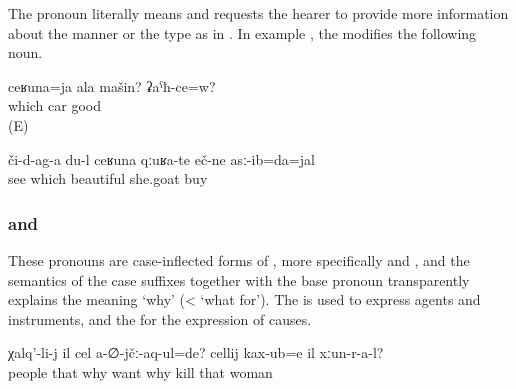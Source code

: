 The pronoun  literally means  and requests the hearer to provide more information about the manner or the type as in . In example , the  modifies the following noun.

\begin{exe}
	\ex	\label{ex:How is your car? Is it good?}
	\gll	ceʁuna=ja	ala	mašin?		ʡaˁħ-ce=w?\\
		which		car	good\\
	\glt	{} (E)

	\ex	\label{ex:Look what beautiful goats I bought}
	\gll	či-d-ag-a	du-l	ceʁuna	qːuʁa-te	eč-ne	asː-ib=da=jal\\
		see		which	beautiful 	she.goat	buy\\
	\glt	{}
\end{exe}



\subsubsection{ and  }
\label{sssec:cel and celij why}

These pronouns are case-inflected forms of  , more specifically   and  , and the semantics of the case suffixes together with the base pronoun transparently explains the meaning `why' (< `what for'). The  is used to express agents and instruments, and the  for the expression of causes.

\begin{exe}
	\ex	\label{ex:Why did the people not love him? Why did the women kill him}
	\gll	χalq'-li-j	il	cel	a-∅-jčː-aq-ul=de?	cellij	kax-ub=e	il xːun-r-a-l?\\
		people	that	why	want	why	kill	that	woman\\
	\glt	{}
\end{exe}


